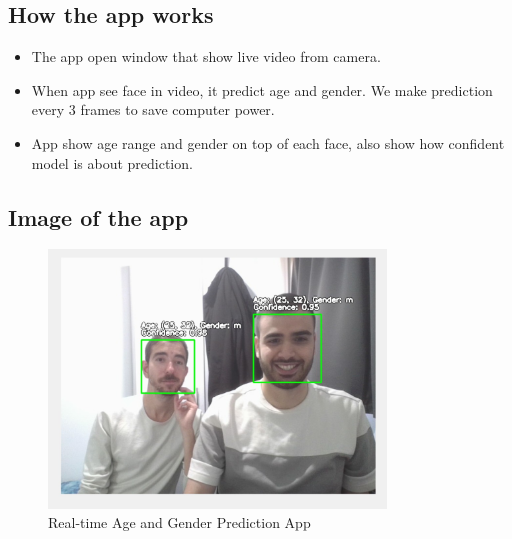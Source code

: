 \documentclass{article}
\begin{document}
\subsection{How the app works}

\begin{itemize}
    \item The app open window that show live video from camera.
    \item When app see face in video, it predict age and gender. We make prediction every 3 frames to save computer power.
    \item App show age range and gender on top of each face, also show how confident model is about prediction.
    
\end{itemize}

\subsection{Image of the app}
\begin{figure}[H]
    \centering
    \includegraphics[width=0.8\textwidth]{assets/app.jpg}
    \caption{Real-time Age and Gender Prediction App}
    \label{fig:app}
\end{figure}

\printbibliography
\end{document}
